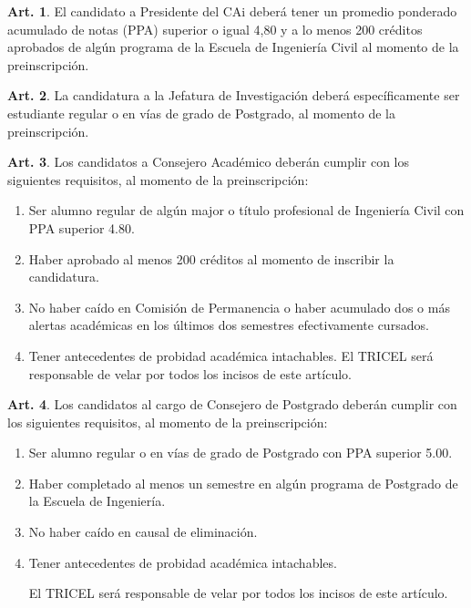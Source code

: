\documentclass[letterpaper,11pt]{article}
\theoremstyle{definition}%
\newtheorem{art}{Art.} %
\begin{document}
\begin{art}\label{requisitosPresidente}
	El candidato a Presidente del CAi deberá tener un promedio ponderado acumulado de notas (PPA) superior o igual 4,80 y a lo menos 200 créditos aprobados de algún programa de la Escuela de Ingeniería Civil al momento de la preinscripción.
\end{art}

\begin{art}\label{requisitosJefeInvestigacion}
	La candidatura a la Jefatura de Investigación deberá específicamente ser estudiante regular o en vías de grado de Postgrado, al momento de la preinscripción.
\end{art}

\begin{art}\label{requisitosCAPregrado}
	Los candidatos a Consejero Académico deberán cumplir con los siguientes requisitos, al momento de la preinscripción:
	\begin{enumerate}
		\item Ser alumno regular de algún major o título profesional de Ingeniería Civil con PPA superior 4.80.

		\item Haber aprobado al menos 200 créditos al momento de inscribir la candidatura.

		\item No haber caído en Comisión de Permanencia o haber acumulado dos o más alertas académicas en los últimos dos semestres efectivamente cursados.

		\item Tener antecedentes de probidad académica intachables.
		      El TRICEL será responsable de velar por todos los incisos de este artículo.
	\end{enumerate}
\end{art}

\begin{art}\label{requisitosCAPostegrado}
	Los candidatos al cargo de Consejero de Postgrado deberán cumplir con los siguientes requisitos, al momento de la preinscripción:
	\begin{enumerate}
		\item Ser alumno regular o en vías de grado de Postgrado con PPA superior 5.00.

		\item Haber completado al menos un semestre en algún programa de Postgrado de la Escuela de Ingeniería.

		\item No haber caído en causal de eliminación.

		\item Tener antecedentes de probidad académica intachables.

		      El TRICEL será responsable de velar por todos los incisos de este artículo.
	\end{enumerate}
\end{art}
\end{document}
